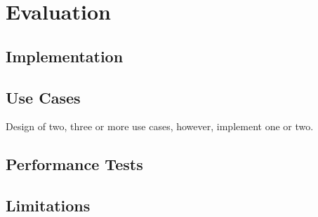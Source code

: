 
\chapter{Evaluation}\label{chapter:evaluation}

\section{Implementation}
\section{Use Cases}
Design of two, three or more use cases, however, implement one or two.
\section{Performance Tests}
\section{Limitations}


